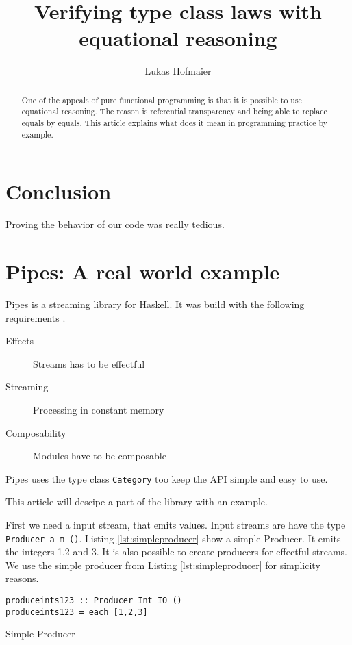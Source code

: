 \documentclass[twoside, a4paper]{article}
\author{Lukas Hofmaier}
\title{Verifying type class laws with equational reasoning}
\begin{document}
\maketitle
\tableofcontents

\begin{abstract}
One of the appeals of pure functional programming is that it is possible to use  equational  reasoning. The reason is referential transparency and being able to replace equals by equals. This article explains what does it mean in programming practice by example.
\end{abstract}






\section{Conclusion}
\label{sec:conclusion}
Proving the behavior of our code was really tedious.

\section{Pipes: A real world example}
\label{sec:pipes}
Pipes is a streaming library for Haskell. It was build with the following requirements \cite{gonzales13}.
\begin{description}
\item[Effects] Streams has to be effectful
\item[Streaming] Processing in constant memory
\item[Composability] Modules have to be composable
\end{description}

Pipes uses the type class \verb|Category| too keep the API simple and easy to use.

This article will descipe a part of the library with an example.

First we need a input stream, that emits values. Input streams are have the type 
\verb|Producer a m ()|.
Listing \ref{lst:simpleproducer} show a simple Producer. It emits the integers 1,2 and 3. It is also possible to create producers for effectful streams. We use the simple producer from Listing \ref{lst:simpleproducer} for simplicity reasons.

\begin{program}
\begin{verbatim}
produceints123 :: Producer Int IO ()
produceints123 = each [1,2,3]
\end{verbatim}
\caption{Simple Producer}
\label{lst:simpleproducer}
\end{program}
\end{document}
